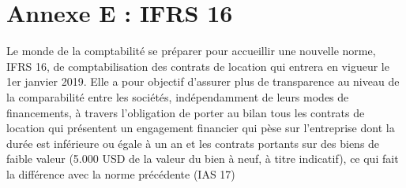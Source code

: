 \setcounter{figure}{0} 
\setcounter{table}{0}
\setcounter{footnote}{0}
\setcounter{equation}{0}
\pagestyle{fancy}
\fancyhf{}
\renewcommand{\chaptermark}[1]{\markboth{\MakeUppercase{#1 }}{}}
\renewcommand{\sectionmark}[1]{\markright{\thesection~ #1}}
\fancyhead[RO]{\bfseries\rightmark}
\fancyhead[LE]{\bfseries\leftmark}
\fancyfoot[RO]{\thepage}
\fancyfoot[LE]{\thepage}
\renewcommand{\headrulewidth}{0.5pt}
\renewcommand{\footrulewidth}{0pt}

\makeatletter
\renewcommand\thefigure{E.\arabic{figure}}
\renewcommand\thetable{E.\arabic{table}} 
\makeatother

\chapter{Annexe E : IFRS 16 }
\graphicspath{{Annexe1/figures/}}


Le monde de la comptabilité se préparer pour accueillir une nouvelle norme, IFRS 16, de comptabilisation des contrats de location qui entrera en vigueur le 1er janvier 2019. Elle a pour objectif d'assurer plus de transparence au niveau de la comparabilité entre les sociétés, indépendamment de leurs modes de financements, à travers l'obligation de porter au bilan tous les contrats de location qui présentent un engagement financier qui pèse sur l'entreprise dont la durée est inférieure ou égale à un an et les contrats portants sur des biens de faible valeur (5.000 USD de la valeur du bien à neuf, à titre indicatif), ce qui fait la différence avec la norme précédente (IAS 17)